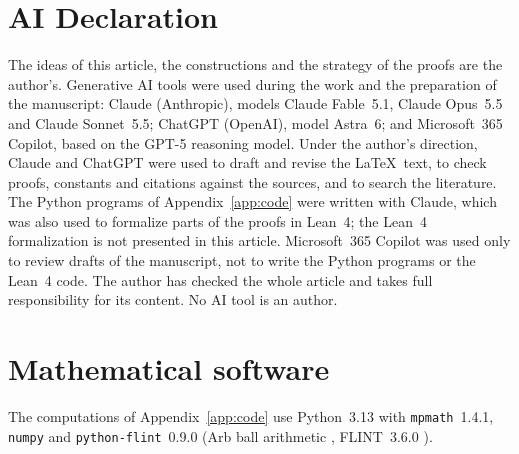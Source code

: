 \documentclass[11pt,a4paper]{article}
\makeatletter
\numberwithin{equation}{section}
\DeclareRobustCommand{\CGref}[1]{\ref{#1}}
\DeclareRobustCommand{\CGcite}[2][]{\if\relax\detokenize{#1}\relax\cite{#2}\else\cite[#1]{#2}\fi}
\let\CG@origref\ref
\newcommand{\CG@gettip}[1]{\@ifundefined{CGTip@#1}{#1}{\csname CGTip@#1\endcsname}}
\newcommand{\CG@getbib}[1]{\@ifundefined{CGBib@#1}{#1}{\csname CGBib@#1\endcsname}}
\DeclareRobustCommand{\CGref}[1]{\pdftooltip{\CG@origref{#1}}{\CG@gettip{#1}}}
\DeclareRobustCommand{\CGcite}[2][]{\pdftooltip{\if\relax\detokenize{#1}\relax\cite{#2}\else\cite[#1]{#2}\fi}{\CG@getbib{#2}}}
\theoremstyle{definition}
\theoremstyle{remark}
\makeatother
\begin{document}
\section*{AI Declaration}
The ideas of this article, the constructions and the strategy of the proofs are the author's. Generative AI tools were used during the work and the preparation of the manuscript: Claude (Anthropic), models Claude Fable~5.1, Claude Opus~5.5 and Claude Sonnet~5.5; ChatGPT (OpenAI), model Astra~6; and Microsoft~365 Copilot, based on the GPT-5 reasoning model. Under the author's direction, Claude and ChatGPT were used to draft and revise the \LaTeX\ text, to check proofs, constants and citations against the sources, and to search the literature. The Python programs of Appendix~\CGref{app:code} were written with Claude, which was also used to formalize parts of the proofs in Lean~4; the Lean~4 formalization is not presented in this article. Microsoft~365 Copilot was used only to review drafts of the manuscript, not to write the Python programs or the Lean~4 code. The author has checked the whole article and takes full responsibility for its content. No AI tool is an author.

\section*{Mathematical software}
The computations of Appendix~\CGref{app:code} use Python~3.13 with \texttt{mpmath}~1.4.1, \texttt{numpy} and \texttt{python-flint}~0.9.0 (Arb ball arithmetic \CGcite{Johansson2017}, FLINT~3.6.0 \CGcite{FLINT}).
\end{document}
